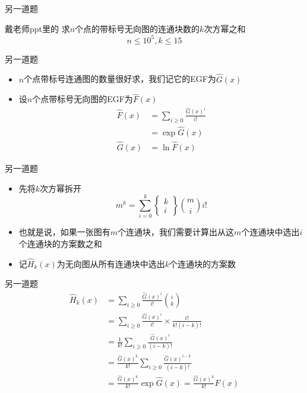 \documentclass{beamer}
\begin{document}
\begin{frame}{另一道题}
    \begin{block}{戴老师ppt里的}
        求$n$个点的带标号无向图的连通块数的$k$次方幂之和
        $$n\leq 10^5, k\leq 15$$
    \end{block}
\end{frame}

\begin{frame}{另一道题}
    \begin{itemize}
        \item $n$个点带标号连通图的数量很好求，我们记它的EGF为$\hat G(x)$ \pause
        \item 设$n$个点带标号无向图的EGF为$\hat F(x)$ \pause
        $$\begin{aligned}
            \hat F(x) &= \sum_{i\geq 0}\frac{\hat G(x)^i}{i!}\\
            &= \exp \hat G(x)\\
            \hat G(x) &= \ln \hat F(x)
        \end{aligned}$$
    \end{itemize}
\end{frame}

\begin{frame}{另一道题}
    \begin{itemize}
        \item 先将$k$次方幂拆开
        $$m^k=\sum_{i = 0}^k\begin{Bmatrix}k\\ i\end{Bmatrix}{m\choose i}i!$$ \pause
        \item 也就是说，如果一张图有$m$个连通块，我们需要计算出从这$m$个连通块中选出$i$个连通块的方案数之和 \pause
        \item 记$\hat H_k(x)$为无向图从所有连通块中选出$k$个连通块的方案数
    \end{itemize}
\end{frame}

\begin{frame}{另一道题}
    $$\begin{aligned}
        \hat H_k(x) &= \sum_{i\geq 0}\frac{\hat G(x)^i}{i!}{i\choose k}\\
        &= \sum_{i\geq 0}\frac{\hat G(x)^i}{i!}\times \frac{i!}{k!(i - k)!}\\
        &= \frac{1}{k!}\sum_{i\geq 0}\frac{\hat G(x)^i}{(i - k)!}\\
        &= \frac{\hat G(x)^k}{k!}\sum_{i\geq 0}\frac{\hat G(x)^{i - k}}{(i - k)!}\\
        &= \frac{\hat G(x)^k}{k!}\exp \hat G(x) = \frac{\hat G(x)^k}{k!}F(x)
    \end{aligned}$$
\end{frame}
\end{document}
